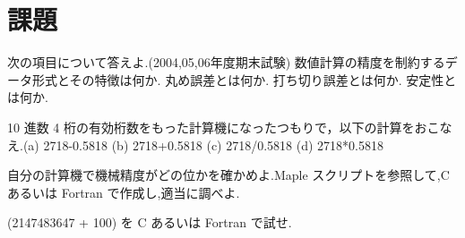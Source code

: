 \documentclass{article}
\begin{document}
\section{\textbf{課題}}
\begin{maplegroup}
次の項目について答えよ.(2004,05,06年度期末試験)
数値計算の精度を制約するデータ形式とその特徴は何か.
丸め誤差とは何か.
打ち切り誤差とは何か.
安定性とは何か.\end{maplegroup}
\begin{maplegroup}
10 進数 4 桁の有効桁数をもった計算機になったつもりで，以下の計算をおこなえ.(a) 2718-0.5818 (b) 2718+0.5818 (c) 2718/0.5818 (d) 2718*0.5818
\end{maplegroup}
\begin{maplegroup}
自分の計算機で機械精度がどの位かを確かめよ.Maple スクリプトを参照して,C あるいは Fortran で作成し,適当に調べよ.
\end{maplegroup}
\begin{maplegroup}
(2147483647 + 100) を C あるいは Fortran で試せ.
\end{maplegroup}
\end{document}

